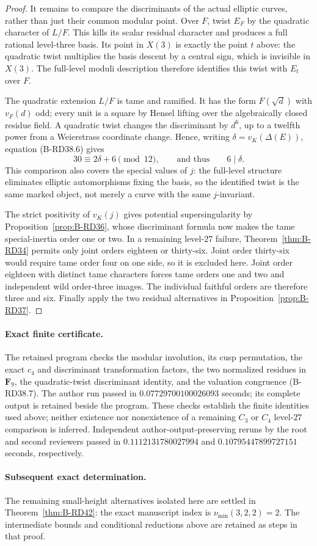 \begin{proof}
It remains to compare the discriminants of the actual elliptic
curves, rather than just their common modular point. Over $F$,
twist $E_F$ by the quadratic character of $L/F$. This kills its
scalar residual character and produces a full rational level-three
basis. Its point in $X(3)$ is exactly the point $t$ above: the
quadratic twist multiplies the basis descent by a central sign,
which is invisible in $X(3)$. The full-level moduli description
therefore identifies this twist with $E_t$ over $F$.

The quadratic extension $L/F$ is tame and ramified. It has the
form $F(\sqrt d)$ with $v_F(d)$ odd; every unit is a square by
Hensel lifting over the algebraically closed residue field.
A quadratic twist changes the discriminant by $d^6$, up to a
twelfth power from a Weierstrass coordinate change. Hence, writing
$\delta=v_K(\Delta(E))$, equation (B-RD38.6) gives
\[
                   30\equiv2\delta+6\pmod {12},
       \qquad\text{and thus}\qquad 6\mid\delta.
                                                        \tag{B-RD38.7}
\]
This comparison also covers the special values of $j$: the
full-level structure eliminates elliptic automorphisms fixing the
basis, so the identified twist is the same marked object, not
merely a curve with the same $j$-invariant.

The strict positivity of $v_K(j)$ gives potential supersingularity
by Proposition~\ref{prop:B-RD36}, whose discriminant formula now
makes the tame special-inertia order one or two. In a remaining
level-$27$ failure, Theorem~\ref{thm:B-RD34} permits only joint
orders eighteen or thirty-six. Joint order thirty-six would require
tame order four on one side, so it is excluded here. Joint order
eighteen with distinct tame characters forces tame orders one and
two and independent wild order-three images. The individual
faithful orders are therefore three and six. Finally apply the two
residual alternatives in Proposition~\ref{prop:B-RD37}.
\end{proof}

\paragraph{Exact finite certificate.}
The retained program  checks
the modular involution, its cusp permutation, the exact $c_4$ and
discriminant transformation factors, the two normalized residues in
$\mathbf F_9$, the quadratic-twist discriminant identity, and the
valuation congruence (B-RD38.7). The author run passed in
$0.07729700100026093$ seconds; its complete output is retained
beside the program.
These checks establish the finite identities used above; neither
existence nor nonexistence of a remaining $C_3$ or $C_4$ level-$27$
comparison is inferred. Independent author-output-preserving reruns by
the root and second reviewers passed in $0.1112131780027994$ and
$0.10795447899727151$ seconds, respectively.

\paragraph{Subsequent exact determination.}
The remaining small-height alternatives isolated here are settled in
Theorem~\ref{thm:B-RD42}: the exact manuscript index is
$\nu_{\min}(3,2,2)=2$. The intermediate bounds and conditional
reductions above are retained as steps in that proof.
